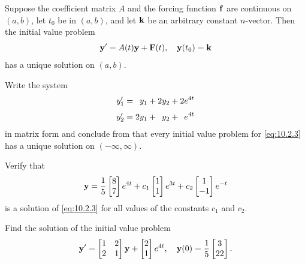 \begin{theorem}\label{thmtype:10.2.1}
Suppose the coefficient matrix $A$ and the forcing function $\mathbf{f}$ are continuous on $(a,b)$, let $t_0$ be in $(a,b)$, and let $\mathbf{k}$ be an arbitrary constant $n$-vector. Then the initial value
problem
\[
\mathbf{y}'=A(t)\mathbf{y}+\mathbf{F}(t), \quad  \mathbf{y}(t_0)=\mathbf{k}
\]
 has a unique solution on $(a,b)$.
\end{theorem}

\begin{example}\label{example:10.2.1}
\begin{alist}
\item %
Write the system
\begin{equation} \label{eq:10.2.3}
\begin{aligned}
y_1'&=\phantom{2}y_1+2y_2+2e^{4t} \\[1\jot]
y_2'&=2y_1+\phantom{2}y_2+\phantom{2}e^{4t}
\end{aligned}
\end{equation}
in matrix form and conclude from  that every
initial value problem for \eqref{eq:10.2.3} has a unique solution on
$(-\infty,\infty)$.
\item %
Verify that
\begin{equation} \label{eq:10.2.4}
\mathbf{y}=
\frac{1}{5}\begin{bmatrix}8\\7\end{bmatrix}e^{4t}+c_1\begin{bmatrix}1\\1\end{bmatrix}e^{3t}+c_2\begin{bmatrix}1\\-1\end{bmatrix}e^{-t}
\end{equation}
is a solution of \eqref{eq:10.2.3} for all values of the constants $c_1$
and $c_2$.
\item %
Find the  solution of the initial value problem
\begin{equation} \label{eq:10.2.5}
\mathbf{y}'=\begin{bmatrix}1&2\\2&1\end{bmatrix}\mathbf{y}+\begin{bmatrix}2\\1\end{bmatrix}e^{4t},\quad  \mathbf{y}(0)=\frac{1}{5}\begin{bmatrix}3\\22\end{bmatrix}.
\end{equation}
\end{alist}
\end{example}

